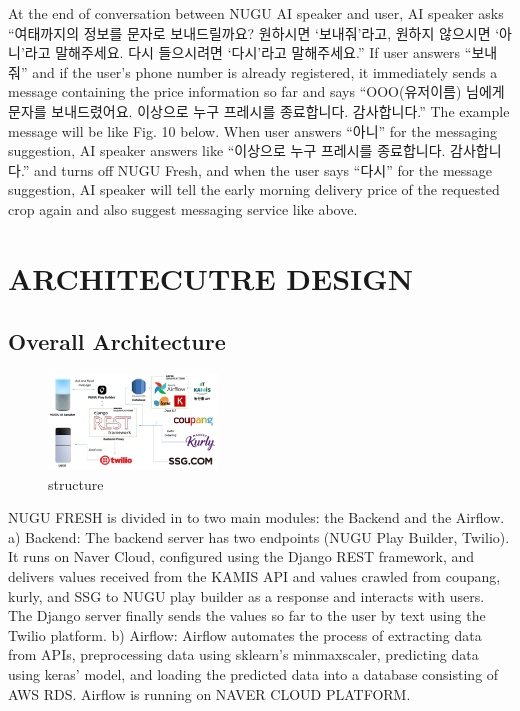 \documentclass[conference]{IEEEtran}
\begin{document}
At the end of conversation between NUGU AI speaker and user, AI speaker asks “여태까지의 정보를 문자로 보내드릴까요? 원하시면 ‘보내줘’라고, 원하지 않으시면 ‘아니’라고 말해주세요. 다시 들으시려면 ‘다시’라고 말해주세요.” If user answers “보내줘” and if the user's phone number is already registered, it immediately sends a message containing the price information so far and says “OOO(유저이름) 님에게 문자를 보내드렸어요. 이상으로 누구 프레시를 종료합니다. 감사합니다.” The example message will be like Fig. 10 below. When user answers “아니” for the messaging suggestion, AI speaker answers like “이상으로 누구 프레시를 종료합니다. 감사합니다.” and turns off NUGU Fresh, and when the user says “다시” for the message suggestion, AI speaker will tell the early morning delivery price of the requested crop again and also suggest messaging service like above.



\section{ARCHITECUTRE DESIGN}
\subsection{Overall Architecture}
\begin{figure}[h]
\centering
    \includegraphics[width =4.5cm]{pictures/structure.eps}
    \hfil
\caption{structure}
\end{figure}
NUGU FRESH is divided in to two main modules: the Backend and the Airflow. 
a) Backend: The backend server has two endpoints (NUGU Play Builder, Twilio). It runs on Naver Cloud, configured using the Django REST framework, and delivers values received from the KAMIS API and values crawled from coupang, kurly, and SSG to NUGU play builder as a response and interacts with users. The Django server finally sends the values so far to the user by text using the Twilio platform.
b) Airflow: Airflow automates the process of extracting data from APIs, preprocessing data using sklearn's minmaxscaler, predicting data using keras' model, and loading the predicted data into a database consisting of AWS RDS. Airflow is running on NAVER CLOUD PLATFORM.
\end{document}
